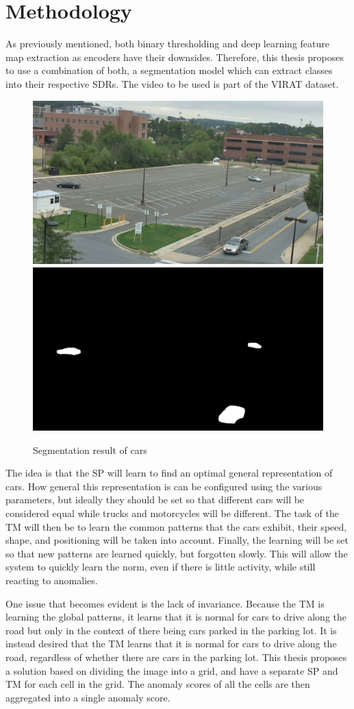 \chapter{Methodology}
As previously mentioned, both binary thresholding and deep learning feature map extraction as encoders have their downsides. Therefore, this thesis proposes to use a combination of both, a segmentation model which can extract classes into their respective SDRs. The video to be used is part of the VIRAT dataset.
\begin{figure}[H]
    \centering
    \includegraphics[width=.45\textwidth]{resources/methodology/original.png}\hfill
    \includegraphics[width=.45\textwidth]{resources/methodology/car_segmentation.png}
    \caption{Segmentation result of cars}
    \label{fig:figure3}
\end{figure}
The idea is that the SP will learn to find an optimal general representation of cars. How general this representation is can be configured using the various parameters, but ideally they should be set so that different cars will be considered equal while trucks and motorcycles will be different. The task of the TM will then be to learn the common patterns that the cars exhibit, their speed, shape, and positioning will be taken into account. Finally, the learning will be set so that new patterns are learned quickly, but forgotten slowly. This will allow the system to quickly learn the norm, even if there is little activity, while still reacting to anomalies.\par
One issue that becomes evident is the lack of invariance. Because the TM is learning the global patterns, it learns that it is normal for cars to drive along the road but only in the context of there being cars parked in the parking lot. It is instead desired that the TM learns that it is normal for cars to drive along the road, regardless of whether there are cars in the parking lot. This thesis proposes a solution based on dividing the image into a grid, and have a separate SP and TM for each cell in the grid. The anomaly scores of all the cells are then aggregated into a single anomaly score.
